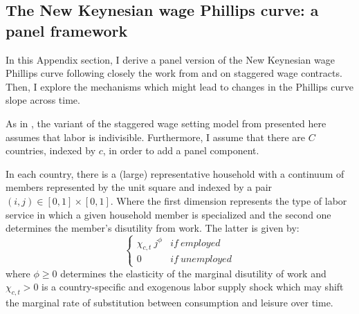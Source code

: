 \documentclass[12pt]{article}
\begin{document}
\begin{appendices}




\clearpage

\setcounter{table}{0}
\setcounter{figure}{0}
\setcounter{equation}{0}

\section{The New Keynesian wage Phillips curve: a panel framework \label{S_Theory}}

In this Appendix section, I derive a panel version of the New Keynesian wage Phillips curve following closely the work from \cite{Gali2011} and \cite{Erceg2000} on staggered wage contracts. Then, I explore the mechanisms which might lead to changes in the Phillips curve slope across time.

As in \cite{Gali2011}, the variant of the staggered wage setting model from \cite{Erceg2000} presented here assumes that labor is indivisible. Furthermore, I assume that there are $C$ countries, indexed by $c$, in order to add a panel component.

In each country, there is a (large) representative household with a continuum of members represented by the unit square and indexed by a pair $(i,j) \in [0,1] \times [0,1]$. Where the first dimension represents the type of labor service in which a given household member is specialized and the second one determines the member's disutility from work. The latter is given by:
\[ 
\left\{
\begin{array}{ll}
      \chi_{c,t} \ j^{\phi} & if \ employed \\
      0 & if \ unemployed
\end{array} 
\right. 
\]
where $\phi \geq 0$ determines the elasticity of the marginal disutility of work and $\chi_{c,t} > 0$ is a country-specific and exogenous labor supply shock which may shift the marginal rate of substitution between consumption and leisure over time.


\end{appendices}
\end{document}

